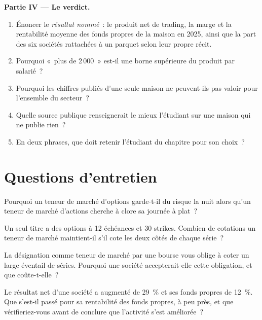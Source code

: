 \begin{problem}
\medskip\noindent\textbf{Partie IV --- Le verdict.}
\begin{enumerate}[resume]
\item Énoncer le \emph{résultat nommé}~: le produit net de trading, la marge et la rentabilité moyenne des fonds propres de la maison en 2025, ainsi que
la part des six sociétés rattachées à un parquet selon leur propre récit.
\item Pourquoi «~plus de 2\,000~» est-il une borne supérieure du produit par salarié~?
\item Pourquoi les chiffres publiés d'une seule maison ne peuvent-ils pas valoir pour l'ensemble du secteur~?
\item Quelle source publique renseignerait le mieux l'étudiant sur une maison qui ne publie rien~?
\item En deux phrases, que doit retenir l'étudiant du chapitre pour son choix~?
\end{enumerate}
\end{problem}

\section{Questions d'entretien}

\begin{interviewq}\label{iq:in:the-options-market-making-houses:1}
Pourquoi un teneur de marché d'options garde-t-il du risque la nuit alors qu'un teneur de marché d'actions cherche à clore sa journée à plat~?
\end{interviewq}

\begin{interviewq}\label{iq:in:the-options-market-making-houses:2}
Un seul titre a des options à 12 échéances et 30 strikes. Combien de cotations un teneur de marché maintient-il
s'il cote les deux côtés de chaque série~?
\end{interviewq}

\begin{interviewq}\label{iq:in:the-options-market-making-houses:3}
La désignation comme teneur de marché par une bourse vous oblige à coter un large éventail de séries. Pourquoi une société accepterait-elle
cette obligation, et que coûte-t-elle~?
\end{interviewq}

\begin{interviewq}\label{iq:in:the-options-market-making-houses:4}
Le résultat net d'une société a augmenté de 29~\% et ses fonds propres de 12~\%. Que s'est-il passé pour sa rentabilité des fonds propres, à peu près, et que
vérifieriez-vous avant de conclure que l'activité s'est améliorée~?
\end{interviewq}

